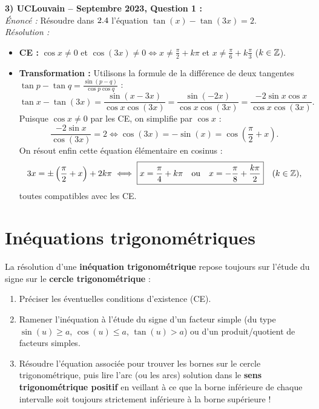 \begin{exemple}
\medskip
\textbf{3) UCLouvain -- Septembre 2023, Question 1 :}\\
\emph{Énoncé :} Résoudre dans $2.4$ l'équation $\tan(x) - \tan(3x) = 2$.\\
\emph{Résolution :}
\begin{itemize}
    \item \textbf{CE :} $\cos x \neq 0$ et $\cos(3x) \neq 0 \iff x \neq \frac{\pi}{2} + k\pi$ et $x \neq \frac{\pi}{6} + k\frac{\pi}{3}$ ($k \in \mathbb{Z}$).
    \item \textbf{Transformation :} Utilisons la formule de la différence de deux tangentes $\tan p - \tan q = \frac{\sin(p-q)}{\cos p \cos q}$ :
    \[
        \tan x - \tan(3x) = \frac{\sin(x - 3x)}{\cos x \cos(3x)} = \frac{\sin(-2x)}{\cos x \cos(3x)} = \frac{-2\sin x \cos x}{\cos x \cos(3x)}.
    \]
    Puisque $\cos x \neq 0$ par les CE, on simplifie par $\cos x$ :
    \[
        \frac{-2\sin x}{\cos(3x)} = 2 \iff \cos(3x) = -\sin(x) = \cos\left(\frac{\pi}{2} + x\right).
    \]
    On résout enfin cette équation élémentaire en cosinus :
    \[
        3x = \pm\left(\frac{\pi}{2} + x\right) + 2k\pi \iff \boxed{x = \frac{\pi}{4} + k\pi \quad \text{ou} \quad x = -\frac{\pi}{8} + \frac{k\pi}{2}} \quad (k\in\mathbb{Z}),
    \]
    toutes compatibles avec les CE.
\end{itemize}
\end{exemple}

\section{Inéquations trigonométriques}

La résolution d'une \textbf{inéquation trigonométrique} repose toujours sur l'étude du signe sur le \textbf{cercle trigonométrique} :
\begin{enumerate}
    \item Préciser les éventuelles conditions d'existence (CE).
    \item Ramener l'inéquation à l'étude du signe d'un facteur simple (du type $\sin(u) \ge a$, $\cos(u) \le a$, $\tan(u) > a$) ou d'un produit/quotient de facteurs simples.
    \item Résoudre l'équation associée pour trouver les bornes sur le cercle trigonométrique, puis lire l'arc (ou les arcs) solution dans le \textbf{sens trigonométrique positif} en veillant à ce que la borne inférieure de chaque intervalle soit toujours strictement inférieure à la borne supérieure !
\end{enumerate}

